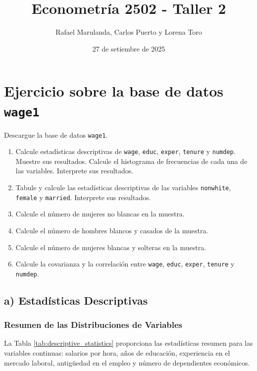 \documentclass[12pt]{article}
\title{Econometría 2502 - Taller 2}
\author{Rafael Marulanda, Carlos Puerto y Lorena Toro}
\date{27 de setiembre de 2025}
\begin{document}
\maketitle

\section{Ejercicio sobre la base de datos \texttt{wage1}}

Descargue la base de datos \texttt{wage1}.

\begin{enumerate}[label=\alph*)]
    \item Calcule estadísticas descriptivas de \texttt{wage}, \texttt{educ}, \texttt{exper}, \texttt{tenure} y \texttt{numdep}. Muestre sus resultados. Calcule el histograma de frecuencias de cada una de las variables. Interprete sus resultados.
    
    \item Tabule y calcule las estadísticas descriptivas de las variables \texttt{nonwhite}, \texttt{female} y \texttt{married}. Interprete sus resultados.
    
    \item Calcule el número de mujeres no blancas en la muestra.
    
    \item Calcule el número de hombres blancos y casados de la muestra.
    
    \item Calcule el número de mujeres blancas y solteras en la muestra.
    
    \item Calcule la covarianza y la correlación entre \texttt{wage}, \texttt{educ}, \texttt{exper}, \texttt{tenure} y \texttt{numdep}.
\end{enumerate}

\subsection*{a) Estadísticas Descriptivas}

\subsubsection*{Resumen de las Distribuciones de Variables}

La Tabla \ref{tab:descriptive_statistics} proporciona las estadísticas resumen para las variables continuas: salarios por hora, años de educación, experiencia en el mercado laboral, antigüedad en el empleo y número de dependientes económicos.
\end{document}
